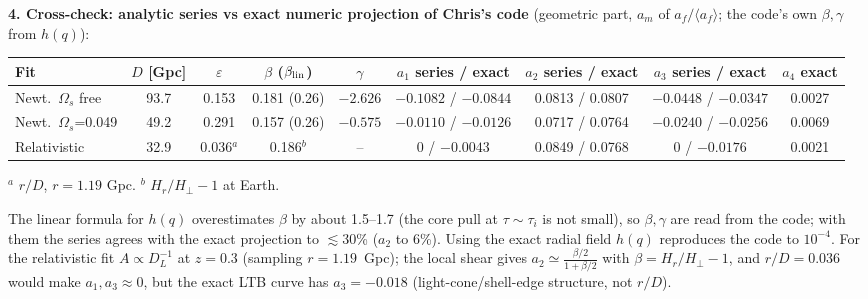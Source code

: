 \documentclass[10pt]{article}
\begin{document}
{\textbf{4. Cross-check: analytic series vs exact numeric projection of Chris's code} (geometric part, $a_m$ of $a_f/\langle a_f\rangle$; the code's own $\beta,\gamma$ from $h(q)$):
\begin{center}\footnotesize\setlength{\tabcolsep}{3pt}\begin{tabular}{lcccccccc}\toprule
Fit & $D$ [Gpc] & $\varepsilon$ & $\beta$ ($\beta_{\rm lin}$) & $\gamma$ & $a_1$ series / exact & $a_2$ series / exact & $a_3$ series / exact & $a_4$ exact\\\midrule
Newt.\ $\Omega_s$ free & 93.7 & 0.153 & 0.181 (0.26) & $-2.626$ & $-0.1082$ / $-0.0844$ & 0.0813 / 0.0807 & $-0.0448$ / $-0.0347$ & 0.0027\\
Newt.\ $\Omega_s$=0.049 & 49.2 & 0.291 & 0.157 (0.26) & $-0.575$ & $-0.0110$ / $-0.0126$ & 0.0717 / 0.0764 & $-0.0240$ / $-0.0256$ & 0.0069\\
Relativistic & 32.9 & 0.036$^a$ & 0.186$^b$ & -- & 0 / $-0.0043$ & 0.0849 / 0.0768 & 0 / $-0.0176$ & 0.0021\\\bottomrule
\end{tabular}\end{center}
{\footnotesize $^a$ $r/D$, $r=1.19$ Gpc. $^b$ $H_r/H_\perp-1$ at Earth.}\par\vspace{-2pt}
The linear formula for $h(q)$ overestimates $\beta$ by about 1.5--1.7 (the core pull at $\tau\sim\tau_i$ is not small), so $\beta,\gamma$ are read from the code; with them the series agrees with the exact projection to $\lesssim$30\% ($a_2$ to 6\%). Using the exact radial field $h(q)$ reproduces the code to $10^{-4}$. For the relativistic fit $A\propto D_L^{-1}$ at $z=0.3$ (sampling $r=1.19$~Gpc); the local shear gives $a_2\simeq\frac{\beta/2}{1+\beta/2}$ with $\beta=H_r/H_\perp-1$, and $r/D=0.036$ would make $a_1,a_3\approx0$, but the exact LTB curve has $a_3=-0.018$ (light-cone/shell-edge structure, not $r/D$).

}
\end{document}
